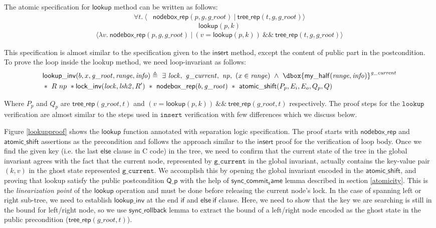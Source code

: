 \documentclass[acmsmall,screen]{acmart}\settopmatter{printfolios=true}
\newcommand\dboxed[1]{\dbox{\ensuremath{#1}}}
\newcommand{\ghost}[2]{\ensuremath{\dboxed{#1}^{#2}}}
\begin{document}
The atomic specification for $\mathsf{lookup}$ method can be written as follows:
\begin{align*} \forall t.\ \langle &\mathsf{nodebox\_rep}(p,g,g\_root)\ |\ \mathsf{tree\_rep}(t,g,g\_root)\rangle \end{align*} 
$$\mathsf{lookup}(p,k)$$ 
\begin{align*}\langle\lambda v.\ \mathsf{nodebox\_rep}(p,g,g\_root)\ |\ (v = \mathsf{lookup}(p,k))\ \&\&\ \mathsf{tree\_rep}(t,g,g\_root)\rangle \end{align*}

This specification is almost similar to the specification given to the $\mathsf{insert}$ method, except the content of public part in the postcondition. To prove the loop inside the lookup method, we need loop-invariant as follows:
\begin{align*} &\mathsf{lookup\_inv}(b, x, \mathit{g\_root}, \mathit{range},\mathit{info}) \triangleq\ \exists\ \mathit{lock},\ \mathit{g\_current},\ \mathit{np},\ (x\in \mathit{range})\ \land \ \ghost{\mathsf{my\_half}(\mathit{range},\mathit{info})}{\mathit{g\_current}}\\& *\ R\ np\ * \mathsf{lock\_inv}(\mathit{lock},\mathit{lsh2},R')\ *\ \mathsf{nodebox\_rep}(b,\mathit{g\_root})\ *\ \mathsf{atomic\_shift} (P_p,E_i,E_o,Q_p,Q) \end{align*}  

Where $P_p$ and $Q_p$ are $\mathsf{tree\_rep}(g\_root, t)$ and $(v = \mathsf{lookup}(p,k))\ \&\&\ \mathsf{tree\_rep}(g\_root, t)$ respectively. The proof steps for the $\texttt{lookup}$ verification are almost similar to the steps used in $\texttt{insert}$ verification with few differences which we discuss below.


Figure \ref{lookupproof} shows the $\mathsf{lookup}$ function annotated with separation logic specification. The proof starts with $\mathsf{nodebox\_rep}$ and $\mathsf{atomic\_shift}$ assertions as the precondition and follows the approach similar to the $\mathsf{insert}$ proof for the verification of loop body. Once we find the given key (i.e. the last $\mathsf{else}$ clause in C code) in the tree, we need to confirm that the current state of the tree in the global invariant agrees with the fact that the current node, represented by $\texttt{g\_current}$ in the global invariant, actually contains the key-value pair $(k, v)$ in the ghost state represented $\texttt{g\_current}$. We accomplish this by opening the global invariant encoded in the $\mathsf{atomic\_shift}$, and proving that lookup satisfy the public postcondition $\mathsf{Q\_p}$ with the help of $\mathsf{sync\_commit_same}$ lemma described in section \ref{atomicity}. This is the \emph{linearization point} of the $\mathsf{lookup}$ operation and must be done before releasing the current node's lock. In the case of spanning left or right sub-tree, we need to establish $\mathsf{lookup\_inv}$ at the end $\mathsf{if}$ and $\mathsf{else\ if}$ clause. Here, we need to show that the key we are searching is still in the bound for left/right node, so we use $\mathsf{sync\_rollback}$ lemma to extract the bound of a left/right node encoded as the ghost state in the public precondition ($\mathsf{tree\_rep}(g\_root, t)$).
\end{document}
